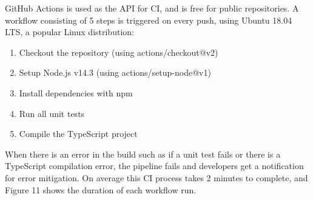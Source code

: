 \documentclass{article}
\begin{document}
GitHub Actions is used as the API for CI, and is free for public repositories. A workflow consisting of 5 steps is triggered on every push, using Ubuntu  18.04 LTS, a popular Linux distribution:

\begin{enumerate}
	\item Checkout the repository (using actions/checkout@v2)
	\item Setup Node.js v14.3 (using actions/setup-node@v1)
	\item Install dependencies with npm
	\item Run all unit tests
	\item Compile the TypeScript project
\end{enumerate}

When there is an error in the build such as if a unit test fails or there is a TypeScript compilation error, the pipeline fails and developers get a notification for error mitigation. On average this CI process takes 2 minutes to complete, and Figure 11 shows the duration of each workflow run.
\end{document}
